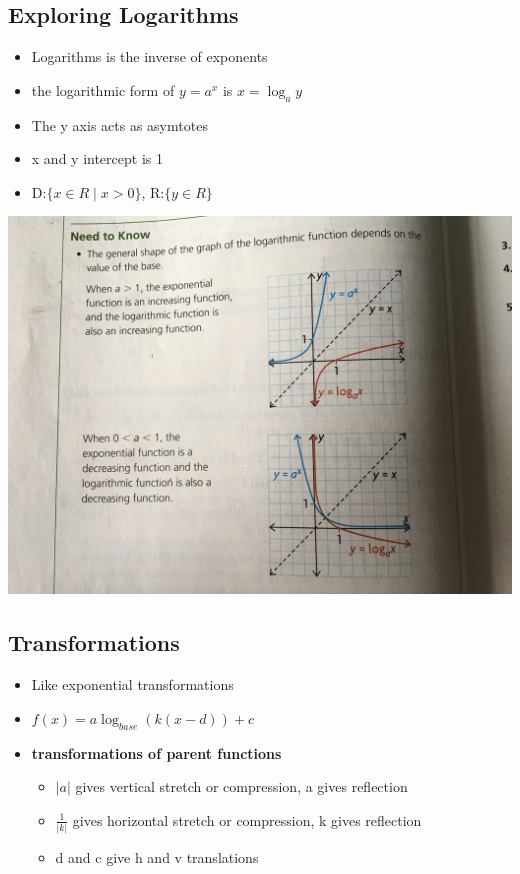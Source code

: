 \documentclass{article}
\begin{document}
    \subsection{Exploring Logarithms}
    \begin{itemize}
        \item Logarithms is the inverse of exponents
        \item the logarithmic form of $y = a^x$ is $x = \log_a y$
        \item The y axis acts as asymtotes
        \item x and y intercept is 1
        \item D:$\{ x \in R \mid x > 0 \}$, R:$\{ y \in R \}$
    \end{itemize}

    \includegraphics[width=\linewidth]{IMG_0837.JPG}

    \subsection{Transformations}
    \begin{itemize}
        \item Like exponential transformations
        \item $f(x) = a \log_{base}(k(x-d))+c$
        \item \textbf{transformations of parent functions}
        \begin{itemize}
            \item $|a|$ gives vertical stretch or compression, a gives reflection
            \item $\frac{1}{|k|}$ gives horizontal stretch or compression, k gives reflection
            \item d and c give h and v translations
        \end{itemize}
    \end{itemize}
\end{document}
